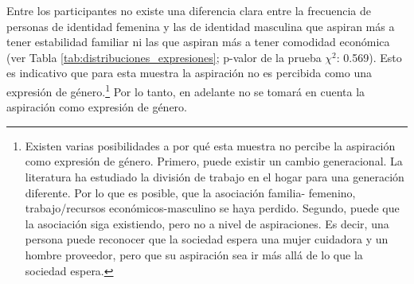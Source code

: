Entre los participantes no existe una diferencia clara entre la frecuencia de personas de identidad femenina y las de identidad masculina que aspiran más a tener estabilidad familiar ni las que aspiran más a tener comodidad económica (ver Tabla \ref{tab:distribuciones_expresiones};  p-valor de la prueba $\chi^2$: 0.569). Esto es indicativo que para esta muestra la aspiración no es percibida como una expresión de género.\footnote{Existen varias posibilidades a por qué esta muestra no percibe la aspiración como expresión de género. Primero, puede existir un cambio generacional. La literatura ha estudiado la división de trabajo en el hogar para una generación diferente. Por lo que es posible, que la asociación familia- femenino, trabajo/recursos económicos-masculino se haya perdido. Segundo, puede que la asociación siga existiendo, pero no a nivel de aspiraciones. Es decir, una persona puede reconocer que la sociedad espera una mujer cuidadora y un hombre proveedor, pero que su aspiración sea ir más allá de lo que la sociedad espera.} Por lo tanto, en adelante no se tomará en cuenta la aspiración como expresión de género.

